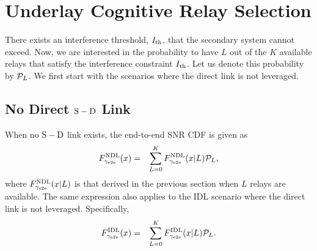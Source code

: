 \documentclass[10pt,journal]{IEEEtran}
\begin{document}
\section{Underlay Cognitive Relay Selection}
There exists an interference threshold, $I_{\rm th}$, that the secondary system cannot exceed. Now, we are interested in the probability to have $L$ out of the $K$ available relays that satisfy the interference constraint $I_{\rm th}$. Let us denote this probability by $\mathcal{P}_L$. We first start with the scenarios where the direct link is not leveraged.
\subsection{No Direct ${\rm S} - {\rm D}$ Link}
When no ${\rm S} - {\rm D}$ link exists,  the end-to-end \ac{SNR} \ac{CDF} is given as
\begin{eqnarray}
F^{\rm NDL}_{\gamma_{\rm e2e}}(x)
&=&\sum_{L=0}^K F^{\rm NDL}_{\gamma_{\rm e2e}}(x \vert L) \mathcal{P}_L,
\end{eqnarray}
where $F^{\rm NDL}_{\gamma_{\rm e2e}}(x \vert L)$ is that derived in the previous section when $L$ relays are available. The same expression also applies to the \ac{IDL} scenario where the direct link is not leveraged. Specifically,
\begin{eqnarray}
F^{\rm IDL}_{\gamma_{\rm e2e}}(x)
&=&\sum_{L=0}^K F^{\rm IDL}_{\gamma_{\rm e2e}}(x \vert L) \mathcal{P}_L.
\end{eqnarray}
\end{document}
